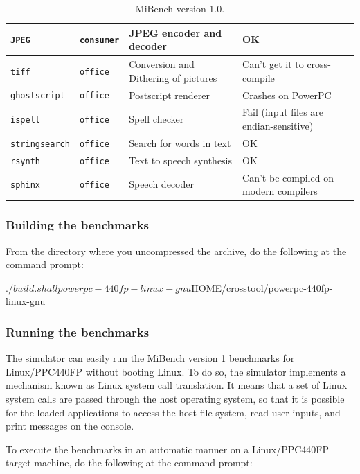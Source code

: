 \begin{table}[p]
\begin{center}
\begin{tabular}{|l|l|p{5cm}|p{5cm}|}
		\hline
		\texttt{JPEG} & \texttt{consumer} & JPEG encoder and decoder & OK \\
		\hline
		\texttt{tiff} & \texttt{office} & Conversion and Dithering of pictures & Can't get it to cross-compile \\
		\hline
		\texttt{ghostscript} & \texttt{office} & Postscript renderer & Crashes on PowerPC  \\
		\hline
		\texttt{ispell} & \texttt{office} & Spell checker & Fail (input files are endian-sensitive)\\
		\hline
		\texttt{stringsearch} & \texttt{office} & Search for words in text & OK \\
		\hline
		\texttt{rsynth} & \texttt{office} & Text to speech synthesis & OK \\
		\hline
		\texttt{sphinx} & \texttt{office} & Speech decoder & Can't be compiled on modern compilers \\
		\hline
		\end{tabular}
	\end{center}
	\caption{MiBench version 1.0.}
	\label{table:mibench}
\end{table}

\subsubsection{Building the benchmarks}

From the directory where you uncompressed the archive, do the following at the command prompt:
\begin{script}
   $ ./build.sh all powerpc-440fp-linux-gnu ${HOME}/crosstool/powerpc-440fp-linux-gnu
\end{script}

\subsubsection{Running the benchmarks}

The simulator can easily run the MiBench version 1 benchmarks for Linux/PPC440FP without booting Linux.
To do so, the simulator implements a mechanism known as Linux system call translation.
It means that a set of Linux system calls are passed through the host operating system, so that it is possible for the loaded applications to access the host file system, read user inputs, and print messages on the console.

\noindent To execute the benchmarks in an automatic manner on a Linux/PPC440FP target machine, do the following at the command prompt:

